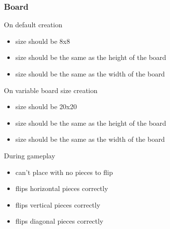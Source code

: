 \documentclass[a4wide, 11pt]{article}
\begin{document}
  \subsubsection{Board}
  \begin{itemize}
    \setlength{\itemsep}{-1mm}
    \begin{item}
      \vspace{-2mm}
      On default creation
      \vspace{-3mm}
      \begin{itemize}
        \setlength{\itemsep}{-1mm}
        \item{size should be 8x8}
        \item{size should be the same as the height of the board}
        \item{size should be the same as the width of the board}
      \end{itemize}
    \end{item}
    \begin{item}
      \vspace{-2mm}
      On variable board size creation
      \vspace{-3mm}
      \begin{itemize}
        \setlength{\itemsep}{-1mm}
        \item{size should be 20x20}
        \item{size should be the same as the height of the board}
        \item{size should be the same as the width of the board}
      \end{itemize}
    \end{item}
    \begin{item}
      \vspace{-2mm}
      During gameplay
      \vspace{-3mm}
      \begin{itemize}
        \setlength{\itemsep}{-1mm}
        \item{can't place with no pieces to flip}
        \item{flips horizontal pieces correctly}
        \item{flips vertical pieces correctly}
        \item{flips diagonal pieces correctly}
      \end{itemize}
    \end{item}
  \end{itemize}
\end{document}
